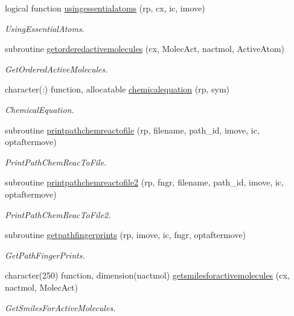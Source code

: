 \begin{DoxyCompactItemize}
logical function \mbox{\hyperlink{namespacerpath_a89f260bcfddda4d489828af14c2651e7}{usingessentialatoms}} (rp, cx, ic, imove)
\begin{DoxyCompactList}\small\item\em Using\+Essential\+Atoms. \end{DoxyCompactList}\item 
subroutine \mbox{\hyperlink{namespacerpath_a2e0e1a6e2688c61a90654578a1f3e039}{getorderedactivemolecules}} (cx, Molec\+Act, nactmol, Active\+Atom)
\begin{DoxyCompactList}\small\item\em Get\+Ordered\+Active\+Molecules. \end{DoxyCompactList}\item 
character(\+:) function, allocatable \mbox{\hyperlink{namespacerpath_aaa967f303c4ed7b7f102c7dad27ab206}{chemicalequation}} (rp, sym)
\begin{DoxyCompactList}\small\item\em Chemical\+Equation. \end{DoxyCompactList}\item 
subroutine \mbox{\hyperlink{namespacerpath_a50f2511a42a3608e9eab945405ba1a93}{printpathchemreactofile}} (rp, filename, path\+\_\+id, imove, ic, optaftermove)
\begin{DoxyCompactList}\small\item\em Print\+Path\+Chem\+Reac\+To\+File. \end{DoxyCompactList}\item 
subroutine \mbox{\hyperlink{namespacerpath_a2b31a5d2057f07a4b4e50d900e7287cc}{printpathchemreactofile2}} (rp, fngr, filename, path\+\_\+id, imove, ic, optaftermove)
\begin{DoxyCompactList}\small\item\em Print\+Path\+Chem\+Reac\+To\+File2. \end{DoxyCompactList}\item 
subroutine \mbox{\hyperlink{namespacerpath_a336b6f37b5f3c99709d0141d4b73eeb5}{getpathfingerprints}} (rp, imove, ic, fngr, optaftermove)
\begin{DoxyCompactList}\small\item\em Get\+Path\+Finger\+Prints. \end{DoxyCompactList}\item 
character(250) function, dimension(nactmol) \mbox{\hyperlink{namespacerpath_aaae5063ee23b5ff91882fb6eeafd4d05}{getsmilesforactivemolecules}} (cx, nactmol, Molec\+Act)
\begin{DoxyCompactList}\small\item\em Get\+Smiles\+For\+Active\+Molecules. \end{DoxyCompactList}\item 

\end{DoxyCompactItemize}
